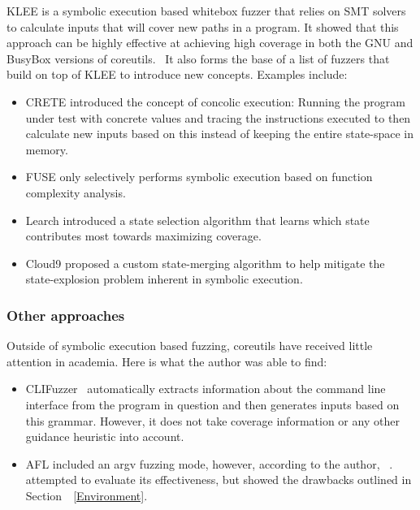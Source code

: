 \documentclass{article}
\let\savedCite=\cite
\renewcommand{\cite}{\unskip~\savedCite}
\let\savedRef=\ref
\renewcommand{\ref}{\unskip~\savedRef}
\begin{document}
\begin{multicols}{2}
    KLEE is a symbolic execution based whitebox fuzzer that relies on SMT solvers to calculate inputs that will cover new paths in a program. It showed that this approach can be highly effective at achieving high coverage in both the GNU and BusyBox versions of coreutils.\cite{KLEE} It also forms the base of a list of fuzzers that build on top of KLEE to introduce new concepts. Examples include:

    \begin{itemize}
        \item CRETE introduced the concept of concolic execution: Running the program under test with concrete values and tracing the instructions executed to then calculate new inputs based on this instead of keeping the entire state-space in memory.\cite{CRETE}
        \item FUSE only selectively performs symbolic execution based on function complexity analysis.\cite{FUSE}
        \item Learch introduced a state selection algorithm that learns which state contributes most towards maximizing coverage.\cite{Learch}
        \item Cloud9 proposed a custom state-merging algorithm to help mitigate the state-explosion problem inherent in symbolic execution.\cite{Cloud9}
    \end{itemize}

    \subsubsection{Other approaches}

    Outside of symbolic execution based fuzzing, coreutils have received little attention in academia. Here is what the author was able to find:

    \begin{itemize}
        \item CLIFuzzer\cite{CLIFuzzer} automatically extracts information about the command line interface from the program in question and then generates inputs based on this grammar. However, it does not take coverage information or any other guidance heuristic into account.
        \item AFL included an argv fuzzing mode, however, according to the author, \cite{AFLPlusPlusargv}. \citeauthor{AFLCoreutils} attempted to evaluate its effectiveness, but showed the drawbacks outlined in Section~\ref{Environment}.\cite{AFLCoreutils}
    \end{itemize}


\end{multicols}
\end{document}
